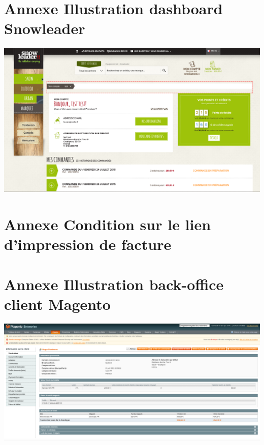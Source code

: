 \documentclass[a4paper,11pt,twoside]{report}
\begin{document}
  \section*{Annexe Illustration dashboard Snowleader}
  \begin{center}
      \includegraphics[width=\textwidth]{images/SL_dashboard_customer.png} 
      \label{SL_dashboard_customer}
  \end{center}
  
  \newpage
  
  \section*{Annexe Condition sur le lien d'impression de facture}
  \label{SL_print_condition}
  
  
  \newpage
  
  \section*{Annexe Illustration back-office client Magento}
  \begin{center}
      \includegraphics[width=\textwidth]{images/SL_BO_customer.png} 
      \label{SL_BO_customer}
  \end{center}
  
\end{document}
